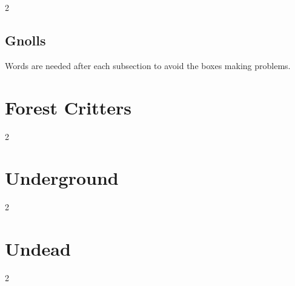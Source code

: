 \documentclass[a4paper,openany]{book}
\begin{document}
\begin{multicols}{2}
\gnome

\gnomishillusionist

\showStdSpells

\subsection{Gnolls}
Words are needed after each subsection to avoid the boxes making problems.

\gnollhunter

\wardog

\gnollshaman

\showStdSpells

\gnollshaman

\end{multicols}

\section{Forest Critters}

\begin{multicols}{2}

\bear

\boar

\cat

\horse

\chitincrawler

\basilisk

\end{multicols}

\section{Underground}

\begin{multicols}{2}

\umberhulk

\watcher

\olmSwarm

\jelly

\jelly

\jelly

\jelly

\end{multicols}

\section{Undead}

\begin{multicols}{2}

\ghoul

\ghast

\demilich

\lich

\end{multicols}
\end{document}
